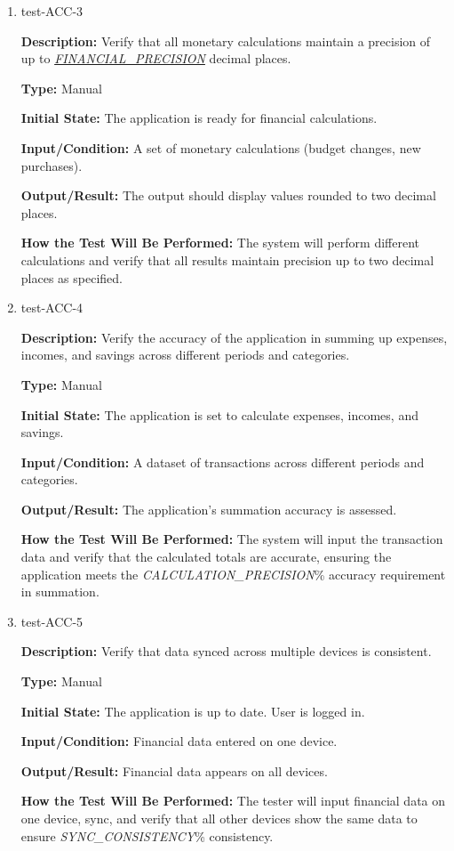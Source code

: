 \documentclass[12pt, titlepage]{article}
\begin{document}
\begin{enumerate}
\item{test-ACC-3\\}

\textbf{Description:} Verify that all monetary calculations maintain a precision
of up to
\href{https://github.com/PlutosCapstone/Plutos/blob/main/docs/SRS/SRS.pdf}{\textit{FINANCIAL\_PRECISION}}
decimal places.

\textbf{Type:} Manual
					
\textbf{Initial State:} The application is ready for financial calculations.
					
\textbf{Input/Condition:} A set of monetary calculations (budget changes, new
purchases).
					
\textbf{Output/Result:} The output should display values rounded to two decimal
places.
					
\textbf{How the Test Will Be Performed:} The system will perform different
calculations and verify that all results maintain precision up to two decimal
places as specified.

\item{test-ACC-4\\}

\textbf{Description:} Verify the accuracy of the application in summing up
expenses, incomes, and savings across different periods and categories.

\textbf{Type:} Manual
					
\textbf{Initial State:} The application is set to calculate expenses, incomes,
and savings.
					
\textbf{Input/Condition:} A dataset of transactions across different periods and
categories.
					
\textbf{Output/Result:} The application's summation accuracy is assessed.
					
\textbf{How the Test Will Be Performed:} The system will input the transaction
data and verify that the calculated totals are accurate, ensuring the
application meets the \textit{CALCULATION\_PRECISION}\% accuracy requirement in
summation.

\item{test-ACC-5\\}

\textbf{Description:} Verify that data synced across multiple devices is
consistent.

\textbf{Type:} Manual
					
\textbf{Initial State:} The application is up to date. User is logged in.
					
\textbf{Input/Condition:} Financial data entered on one device.
					
\textbf{Output/Result:} Financial data appears on all devices.
					
\textbf{How the Test Will Be Performed:} The tester will input financial data on
one device, sync, and verify that all other devices show the same data to ensure
\textit{SYNC\_CONSISTENCY}\% consistency.

\end{enumerate}
\end{document}
